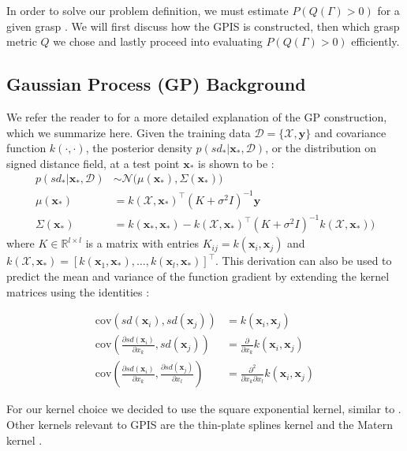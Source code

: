 \documentclass[journal,transmag]{IEEEtran}%
\newcommand{\by}{\mathbf{y}}
\newcommand{\bx}{\mathbf{x}}
\newcommand{\mX}{\mathcal{X}}
\newcommand{\mD}{\mathcal{D}}
\newcommand{\mN}{\mathcal{N}}
\begin{document}
 \label{sec:Appendix}
 In order to solve our problem definition, we must estimate $P(Q(\Gamma)>0)$ for a given grasp . We will first discuss how the GPIS is constructed, then which grasp metric $Q$ we chose and lastly proceed into evaluating $P(Q(\Gamma)>0)$ efficiently. 


\subsection{Gaussian Process (GP) Background}\label{sec:GP}
We refer the reader to \cite{mahler2015opt} for a more detailed explanation of the GP construction, which we summarize here.  Given the training data $\mD = \{\mX, \by\}$ and covariance function $k(\cdot,\cdot)$, the posterior density $p(sd_*|\bx_*,\mD)$, or the distribution on signed distance field, at a test point $\bx_{*}$ is shown to be \cite{rasmussen2010gaussian}:
\begin{align*}
	p(sd_*|\bx_*,\mD) &\sim \mN\big(\mu(\bx_*), \Sigma(\bx_*)\big) \\
	\mu(\bx_*) &= k(\mX,\bx_*)^{\intercal}(K + \sigma^2I)^{-1}\by \\
	\Sigma(\bx_*) &= k(\bx_*,\bx_*)-k(\mX,\bx_*)^{\intercal}(K+\sigma^2I)^{-1}k(\mX,\bx_*)\big) 
\end{align*}
where $K \in \mathbb{R}^{l \times l}$ is a matrix with entries $K_{ij} = k(\bx_i,\bx_j)$ and $k(\mX,\bx_*) = [k(\bx_1,\bx_*),\ldots,k(\bx_l,\bx_*)]^{\intercal}$. 
This derivation can also be used to predict the mean and variance of the function gradient by extending the kernel matrices using the identities \cite{solak2003derivative}:

\vspace{-2ex}
\begin{align}
	\text{cov}\left(sd(\bx_i), sd(\bx_j) \right) &=  k(\bx_i, \bx_j) \\
	\text{cov}\left(\frac{\partial sd (\bx_i)}{\partial x_k}, sd(\bx_j) \right) &= \frac{\partial}{\partial x_k} k(\bx_i, \bx_j) \label{eq:mean_gradient}\\
	\text{cov}\left(\frac{\partial sd (\bx_i)}{\partial x_k}, \frac{\partial sd (\bx_j)}{\partial x_l} \right) &= \frac{\partial^2}{\partial x_k \partial x_l} k(\bx_i, \bx_j)\label{eq:cov_gradient}
\end{align}


For our kernel choice we decided to use the square exponential kernel, similar to \cite{dragiev2011}. Other kernels relevant to GPIS are the thin-plate splines kernel and the Matern kernel \cite{williams2007}. 
\end{document}
